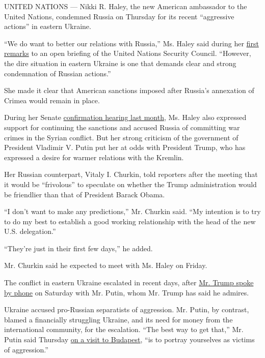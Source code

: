 UNITED NATIONS --- Nikki R. Haley, the new American ambassador to the
United Nations, condemned Russia on Thursday for its recent ``aggressive
actions'' in eastern Ukraine.

``We do want to better our relations with Russia,'' Ms. Haley said
during her \href{https://usun.state.gov/remarks/7668}{first remarks} to
an open briefing of the United Nations Security Council. ``However, the
dire situation in eastern Ukraine is one that demands clear and strong
condemnation of Russian actions.''

She made it clear that American sanctions imposed after Russia's
annexation of Crimea would remain in place.

During her Senate
\href{https://www.nytimes.com/2017/01/18/us/politics/nikki-haley-un-ambassador-russia-war-crime.html}{confirmation
hearing last month}, Ms. Haley also expressed support for continuing the
sanctions and accused Russia of committing war crimes in the Syrian
conflict. But her strong criticism of the government of President
Vladimir V. Putin put her at odds with President Trump, who has
expressed a desire for warmer relations with the Kremlin.

Her Russian counterpart, Vitaly I. Churkin, told reporters after the
meeting that it would be ``frivolous'' to speculate on whether the Trump
administration would be friendlier than that of President Barack Obama.

``I don't want to make any predictions,'' Mr. Churkin said. ``My
intention is to try to do my best to establish a good working
relationship with the head of the new U.S. delegation.''

``They're just in their first few days,'' he added.

Mr. Churkin said he expected to meet with Ms. Haley on Friday.

The conflict in eastern Ukraine escalated in recent days, after
\href{https://www.nytimes.com/2017/01/28/us/politics/trump-putin-russia-sanctions.html?action=click\&contentCollection=Europe\&module=RelatedCoverage\&region=EndOfArticle\&pgtype=article}{Mr.
Trump spoke by phone} on Saturday with Mr. Putin, whom Mr. Trump has
said he admires.

Ukraine accused pro-Russian separatists of aggression. Mr. Putin, by
contrast, blamed a financially struggling Ukraine, and its need for
money from the international community, for the escalation. ``The best
way to get that,'' Mr. Putin said Thursday
\href{https://www.nytimes.com/2017/02/02/world/europe/vladimir-putin-hungary.html?ref=world}{on
a visit to Budapest}, ``is to portray yourselves as victims of
aggression.''

